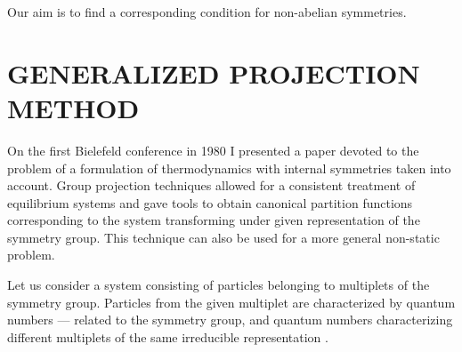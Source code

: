 \documentclass[a4paper,aps]{revtex4}
\begin{document}
Our aim\cite{TurRaf} is to find a corresponding condition for non-abelian
symmetries.

\section{GENERALIZED PROJECTION METHOD}

On the first Bielefeld conference in 1980 I presented a paper
\cite{Redlich:1980bf} devoted to the problem of a formulation of
thermodynamics with internal symmetries taken into account. Group
projection techniques allowed for a consistent treatment of
equilibrium systems and gave tools to obtain canonical partition
functions corresponding to the system transforming under given
representation of the symmetry group. This technique can also be
used for a more general non-static problem.

Let us consider a system consisting of particles belonging to
multiplets \coordHE{} of the symmetry group. Particles from the
given multiplet \coordHE{} are characterized by quantum numbers
\coordHE{} --- related to the symmetry group, and quantum numbers
\coordHE{} characterizing different multiplets of the same irreducible
representation \coordHE{}.
\end{document}
